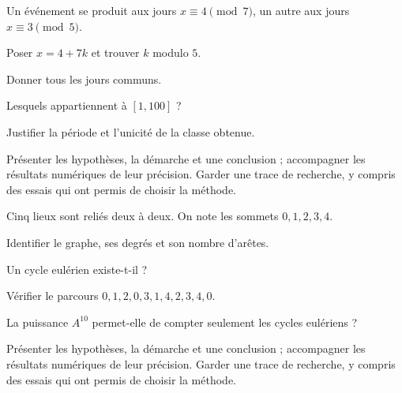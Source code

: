 \label{projet-5}
Un événement se produit aux jours $x\equiv4\pmod7$, un autre aux jours $x\equiv3\pmod5$.
\begin{questions}
\item Poser $x=4+7k$ et trouver $k$ modulo $5$.
\item Donner tous les jours communs.
\item Lesquels appartiennent à $[1,100]$ ?
\item Justifier la période et l’unicité de la classe obtenue.
\end{questions}
\vspace{5mm}\noindent Présenter les hypothèses, la démarche et une conclusion ; accompagner les résultats numériques de leur précision. Garder une trace de recherche, y compris des essais qui ont permis de choisir la méthode.\par\vfill{}\par\vspace{2mm}\noindent{}
\label{projet-6}
Cinq lieux sont reliés deux à deux. On note les sommets $0,1,2,3,4$.
\begin{questions}
\item Identifier le graphe, ses degrés et son nombre d’arêtes.
\item Un cycle eulérien existe-t-il ?
\item Vérifier le parcours $0,1,2,0,3,1,4,2,3,4,0$.
\item La puissance $A^{10}$ permet-elle de compter seulement les cycles eulériens ?
\end{questions}
\vspace{5mm}\noindent Présenter les hypothèses, la démarche et une conclusion ; accompagner les résultats numériques de leur précision. Garder une trace de recherche, y compris des essais qui ont permis de choisir la méthode.\par\vfill{}\par\vspace{2mm}\noindent{}
